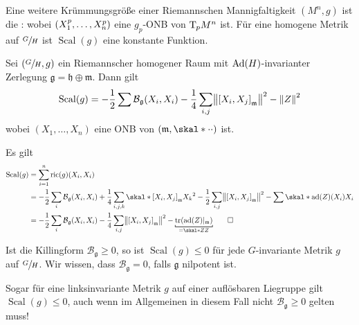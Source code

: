 Eine weitere Krümmungsgröße einer Riemannschen Mannigfaltigkeit $(M^n,g)$ ist die :
wobei $\enbrace*{X_1^p, \ldots ,X_n^p}$ eine $g_p$-ONB von $\Tmap_p M^n$ ist.
Für eine homogene Metrik auf $\sfrac{G}{H}$ ist $\operatorname{Scal}(g)$ eine konstante Funktion.

\begin{satz}[label=satz:329,{name=[Skalarkrümmung riemannscher homogener Raum]}]
	Sei $(\sfrac{G}{H},g)$ ein Riemannscher homogener Raum mit $\Ad(H)$-invarianter Zerlegung $\mathfrak{g} = \mathfrak{h} \oplus \mathfrak{m}$.
	Dann gilt
	\[
		\operatorname{Scal}(g) = - \frac{1}{2} \sum \mathcal{B}_{\mathfrak{g}} (X_i,X_i) - \frac{1}{4} \sum_{i,j} \norm*{\benbrace*{X_i,X_j}_{\mathfrak{m}}}^2 - \norm*{Z}^2
	\]
	wobei $(X_1, \ldots ,X_n)$ eine ONB von $(\mathfrak{m}, \skal*{\cdot }{\cdot })$ ist.
\end{satz}
\begin{beweis}
	Es gilt
	\begin{align}
		\operatorname{Scal}(g) &= \sum_{i=1}^{n} \ric(g) \enbrace*{X_i,X_i} \\
		&= - \frac{1}{2} \sum_i \mathcal{B}_{\mathfrak{g}}(X_i,X_i) + \frac{1}{4} \sum_{i,j,k} \skal*{\benbrace*{X_i,X_j}_{\mathfrak{m}}}{X_k}^2
		- \frac{1}{2} \sum_{i,j} \norm*{\benbrace*{X_i,X_j}_{\mathfrak{m}}}^2 - \sum \skal*{\ad(Z)(X_i)}{X_i} \\
		&= - \frac{1}{2} \sum_i \mathcal{B}_{\mathfrak{g}}(X_i,X_i) - \frac{1}{4} \sum_{i,j} \norm*{\benbrace*{X_i,X_j}_{\mathfrak{m}}}^2 - \Underbracket{\tr \enbrace*{\ad(Z)|_{\mathfrak{m}}}}{= \skal*{Z}{Z}} \qedhere
	\end{align}
\end{beweis}

Ist die Killingform $\mathcal{B}_{\mathfrak{g}} \ge 0$, so ist $\operatorname{Scal}(g) \le 0$ für jede $G$-invariante Metrik $g$ auf $\sfrac{G}{H}$.
Wir wissen, dass $\mathcal{B}_{\mathfrak{g}}=0$, falls $\mathfrak{g}$ nilpotent ist.

\begin{bemerkung*}[{name=[Fall einer nur linksinvarianten Metrik]}]
	Sogar für eine linksinvariante Metrik $g$ auf einer auflösbaren Liegruppe gilt $\operatorname{Scal}(g) \le 0$, auch wenn im Allgemeinen in diesem Fall nicht $\mathcal{B}_{\mathfrak{g}}\ge 0$ gelten muss!
\end{bemerkung*}

